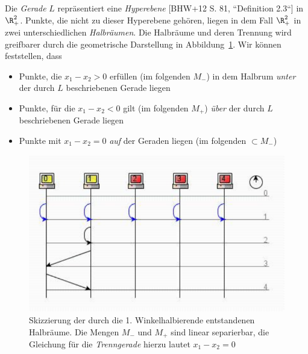 Die \textit{Gerade} $L$ repräsentiert eine \textit{Hyperebene} [BHW+12 S. 81, ``Definition 2.3``] in $\R_+^2$.
Punkte, die nicht zu dieser Hyperebene gehören, liegen in dem Fall $\R_+^2$ in zwei unterschiedlichen \textit{Halbräumen}\footnotemark[19].
Die Halbräume und deren Trennung wird greifbarer durch die geometrische Darstellung in Abbildung~\ref{fig-halbraeume}.
Wir können feststellen, dass


\begin{itemize}
    \item Punkte, die $x_1 - x_2 > 0$ erfüllen (im folgenden $M_-$) in dem Halbrum \textit{unter} der durch $L$ beschriebenen Gerade liegen
    \item Punkte, für die  $x_1 - x_2 < 0$ gilt (im folgenden $M_+$) \textit{über} der durch $L$ beschriebenen Gerade liegen
    \item Punkte mit $x_1 - x_2 = 0$ \textit{auf} der Geraden liegen (im folgenden $\subset M_-$\footnotemark[20])
\end{itemize}


\begin{figure}[h]
    \centering
    \includegraphics{images/p1ReadSeq.pdf}
    \caption{Skizzierung der durch die 1. Winkelhalbierende entstandenen Halbräume. Die Mengen $M_-$ und $M_+$ sind linear separierbar, die Gleichung für die \textit{Trenngerade} hierzu lautet $x_1 - x_2 = 0$}
    \label{fig-halbraeume}
\end{figure}





